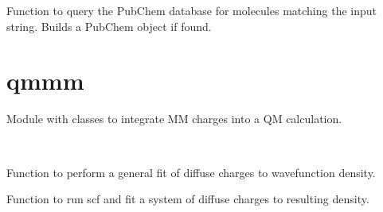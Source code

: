\documentclass[letterpaper,10pt,english]{sphinxmanual}
\begin{document}

\begin{fulllineitems}
\label{index:pubchem.getPubChemResults}
Function to query the PubChem database for molecules matching the
input string. Builds a PubChem object if found.

\end{fulllineitems}



\section{qmmm}
\label{index:qmmm}\label{index:module-qmmm}
Module with classes to integrate MM charges into
a QM calculation.

\begin{fulllineitems}
\label{index:qmmm.Diffuse}~

\begin{fulllineitems}
\label{index:qmmm.Diffuse.fitGeneral}
Function to perform a general fit of diffuse charges
to wavefunction density.

\end{fulllineitems}


\begin{fulllineitems}
\label{index:qmmm.Diffuse.fitScf}
Function to run scf and fit a system of diffuse charges to
resulting density.

\end{fulllineitems}


\begin{fulllineitems}
\label{index:qmmm.Diffuse.populateExtern}
\end{fulllineitems}


\end{fulllineitems}

\end{document}
